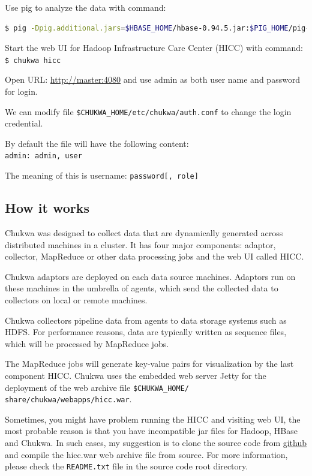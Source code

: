 Use pig to analyze the data with command:
\lstset{style=bashstyle}
\begin{lstlisting}[language=bash]
$ pig -Dpig.additional.jars=$HBASE_HOME/hbase-0.94.5.jar:$PIG_HOME/pig-0.11.0.jar $CHUKWA_HOME/share/chukwa/script/pig/ClusterSummary.pig
\end{lstlisting}

Start the web UI for Hadoop Infrastructure Care Center (HICC) with command: \\
\verb|$ chukwa hicc|

Open URL: \url{http://master:4080} and use admin as both user name and password for login.

We can modify file \verb|$CHUKWA_HOME/etc/chukwa/auth.conf| to change the login credential.

By default the file will have the following content:\\
\verb|admin: admin, user|

The meaning of this is username: \verb|password[, role]|

\subsection*{How it works}
Chukwa was designed to collect data that are dynamically generated across distributed machines in a cluster. It has four major components: adaptor, collector, MapReduce or other data processing jobs and the web UI called HICC.

Chukwa adaptors are deployed on each data source machines. Adaptors run on these machines in the umbrella of agents, which send the collected data to collectors on local or remote machines.

Chukwa collectors pipeline data from agents to data storage systems such as HDFS. For performance reasons, data are typically written as sequence files, which will be processed by MapReduce jobs.

The MapReduce jobs will generate key-value pairs for visualization by the last component HICC. Chukwa uses the embedded web server Jetty for the deployment of the web archive file \verb|$CHUKWA_HOME/ share/chukwa/webapps/hicc.war|.

Sometimes, you might have problem running the HICC and visiting web UI, the most probable reason is that you have incompatible jar files for Hadoop, HBase and Chukwa. In such cases, my suggestion is to clone the source code from \href{https://github.com/apache/chukwa}{github} and compile the hicc.war web archive file from source. For more information, please check the \verb|README.txt| file in the source code root directory.

